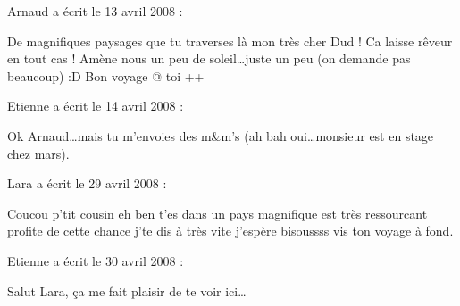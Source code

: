 \medskip
Arnaud a écrit le 13 avril 2008 :
\begin{displayquote}
De magnifiques paysages que tu traverses là mon très cher Dud ! Ca laisse rêveur en tout cas !
Amène nous un peu de soleil\dots juste un peu (on demande pas beaucoup) :D
Bon voyage @ toi
++
\end{displayquote}

\medskip
Etienne a écrit le 14 avril 2008 :
\begin{displayquote}
Ok Arnaud\dots mais tu m'envoies des m\&m's (ah bah oui\dots monsieur est en stage chez mars).
\end{displayquote}

\medskip
Lara a écrit le 29 avril 2008 :
\begin{displayquote}
Coucou p'tit cousin eh ben t'es dans un pays magnifique est très ressourcant profite de cette chance j'te dis à très vite j'espère bisoussss vis ton voyage à fond.
\end{displayquote}

\medskip
Etienne a écrit le 30 avril 2008 :
\begin{displayquote}
Salut Lara, ça me fait plaisir de te voir ici\dots
\end{displayquote}

\vfill
